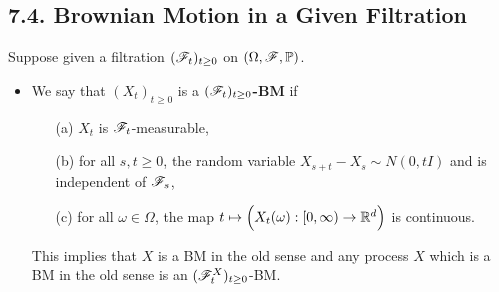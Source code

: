 \documentclass[10pt,a4paper]{report}
\begin{document}
\subsection*{7.4. Brownian Motion in a Given Filtration}

Suppose given a filtration $(\mathscr{F}_t)_{t\geq 0}$ on $(\Omega, \mathscr{F}, \mathbb{P})$.
\begin{itemize}
\item We say that $(X_t)_{t\geq 0}$ is a \textbf{$(\mathscr{F}_t)_{t\geq 0}$-BM} if
\begin{itemize}
\item[(a)] $X_t$ is $\mathscr{F}_t$-measurable,
\item[(b)] for all $s,t \geq 0$, the random variable $X_{s+t} - X_s \sim N(0, tI)$ and is independent of $\mathscr{F}_s$,
\item[(c)] for all $\omega \in \Omega$, the map $t\mapsto \Big( X_t(\omega) : [0,\infty ) \rightarrow \mathbb{R}^d \Big)$ is continuous.
\end{itemize}
This implies that $X$ is a BM in the old sense and any process $X$ which is a BM in the old sense is an $(\mathscr{F}_t^X)_{t\geq 0}$-BM.
\end{itemize}
\end{document}
